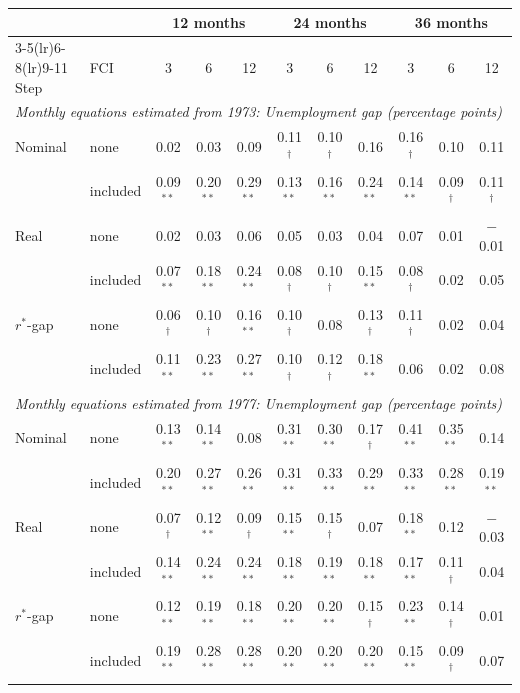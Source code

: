 \begin{tabular}{llccccccccc}
\toprule
 & & \multicolumn{3}{c}{12 months} & \multicolumn{3}{c}{24 months} & \multicolumn{3}{c}{36 months}\\
\cmidrule(lr){3-5}\cmidrule(lr){6-8}\cmidrule(lr){9-11}
Step & FCI & 3 & 6 & 12 & 3 & 6 & 12 & 3 & 6 & 12 \\
\midrule
\multicolumn{11}{l}{\textit{Monthly equations estimated from 1973: Unemployment gap (percentage points)}}\\
Nominal & none & 0.02 & 0.03 & 0.09 & 0.11$^{\dagger}$ & 0.10$^{\dagger}$ & 0.16 & 0.16$^{\dagger}$ & 0.10 & 0.11 \\
 & included & 0.09$^{**}$ & 0.20$^{**}$ & 0.29$^{**}$ & 0.13$^{**}$ & 0.16$^{**}$ & 0.24$^{**}$ & 0.14$^{**}$ & 0.09$^{\dagger}$ & 0.11$^{\dagger}$ \\
Real & none & 0.02 & 0.03 & 0.06 & 0.05 & 0.03 & 0.04 & 0.07 & 0.01 & $-$0.01 \\
 & included & 0.07$^{**}$ & 0.18$^{**}$ & 0.24$^{**}$ & 0.08$^{\dagger}$ & 0.10$^{\dagger}$ & 0.15$^{**}$ & 0.08$^{\dagger}$ & 0.02 & 0.05 \\
$r^*$-gap & none & 0.06$^{\dagger}$ & 0.10$^{\dagger}$ & 0.16$^{**}$ & 0.10$^{\dagger}$ & 0.08 & 0.13$^{\dagger}$ & 0.11$^{\dagger}$ & 0.02 & 0.04 \\
 & included & 0.11$^{**}$ & 0.23$^{**}$ & 0.27$^{**}$ & 0.10$^{\dagger}$ & 0.12$^{\dagger}$ & 0.18$^{**}$ & 0.06 & 0.02 & 0.08 \\
\midrule
\multicolumn{11}{l}{\textit{Monthly equations estimated from 1977: Unemployment gap (percentage points)}}\\
Nominal & none & 0.13$^{**}$ & 0.14$^{**}$ & 0.08 & 0.31$^{**}$ & 0.30$^{**}$ & 0.17$^{\dagger}$ & 0.41$^{**}$ & 0.35$^{**}$ & 0.14 \\
 & included & 0.20$^{**}$ & 0.27$^{**}$ & 0.26$^{**}$ & 0.31$^{**}$ & 0.33$^{**}$ & 0.29$^{**}$ & 0.33$^{**}$ & 0.28$^{**}$ & 0.19$^{**}$ \\
Real & none & 0.07$^{\dagger}$ & 0.12$^{**}$ & 0.09$^{\dagger}$ & 0.15$^{**}$ & 0.15$^{\dagger}$ & 0.07 & 0.18$^{**}$ & 0.12 & $-$0.03 \\
 & included & 0.14$^{**}$ & 0.24$^{**}$ & 0.24$^{**}$ & 0.18$^{**}$ & 0.19$^{**}$ & 0.18$^{**}$ & 0.17$^{**}$ & 0.11$^{\dagger}$ & 0.04 \\
$r^*$-gap & none & 0.12$^{**}$ & 0.19$^{**}$ & 0.18$^{**}$ & 0.20$^{**}$ & 0.20$^{**}$ & 0.15$^{\dagger}$ & 0.23$^{**}$ & 0.14$^{\dagger}$ & 0.01 \\
 & included & 0.19$^{**}$ & 0.28$^{**}$ & 0.28$^{**}$ & 0.20$^{**}$ & 0.20$^{**}$ & 0.20$^{**}$ & 0.15$^{**}$ & 0.09$^{\dagger}$ & 0.07 \\

\end{tabular}

